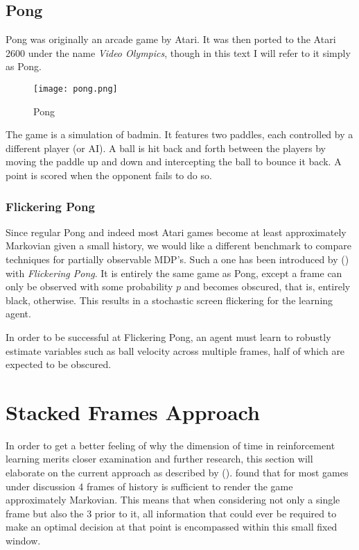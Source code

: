 \subsection{Pong}
\label{sub:pong}
Pong was originally an arcade game by Atari.
It was then ported to the Atari 2600
under the name \textit{Video Olympics},
though in this text I will refer to it simply as Pong.

\begin{figure}[htpb]
  \centering
  \texttt{[image: pong.png]}
  \caption{Pong}
  \label{fig:pong}
\end{figure}

The game is a simulation of badmin.
It features two paddles,
each controlled by a different player (or AI).
A ball is hit back and forth between the players
by moving the paddle up and down
and intercepting the ball to bounce it back.
A point is scored when the opponent
fails to do so.

\subsubsection{Flickering Pong}
\label{sec:flickering_pong}
Since regular Pong and indeed most Atari games
become at least approximately Markovian
given a small history,
we would like a different benchmark
to compare techniques
for partially observable MDP's.
Such a one has been introduced by \citeauthor{Hausknecht2015} (\citeyear{Hausknecht2015})
with \textit{Flickering Pong}.
It is entirely the same game as Pong,
except a frame can only be observed with some probability $p$
and becomes obscured, that is, entirely black, otherwise.
This results in a stochastic screen flickering for the learning agent.

In order to be successful at Flickering Pong,
an agent must learn to robustly
estimate variables such as ball velocity
across multiple frames,
half of which are expected to be obscured.

\section{Stacked Frames Approach}
\label{sec:stacked_frames_approach}
In order to get a better feeling
of why the dimension of time in reinforcement learning
merits closer examination and further research,
this section will elaborate on the current approach
as described by
\citeauthor{Mnih2013} (\citeyear{Mnih2013}).
\citeauthor{Mnih2013}
found that for most games under discussion
4 frames of history is sufficient to render the game approximately Markovian.
This means that when considering not only a single frame
but also the 3 prior to it,
all information that could ever be required to make an optimal decision
at that point is encompassed within this small fixed window.

